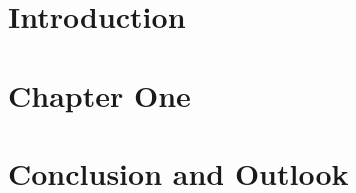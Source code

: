 \documentclass[twoside, 12pt]{report}
\begin{document}

\newpage\null\newpage



\begin{abstract}

\end{abstract}

\setcounter{page}{6}
\tableofcontents

\chapter{Introduction}



\chapter{Chapter One}


\chapter{Conclusion and Outlook}



\printbibliography[heading=bibintoc,title={References}]
\end{document}
